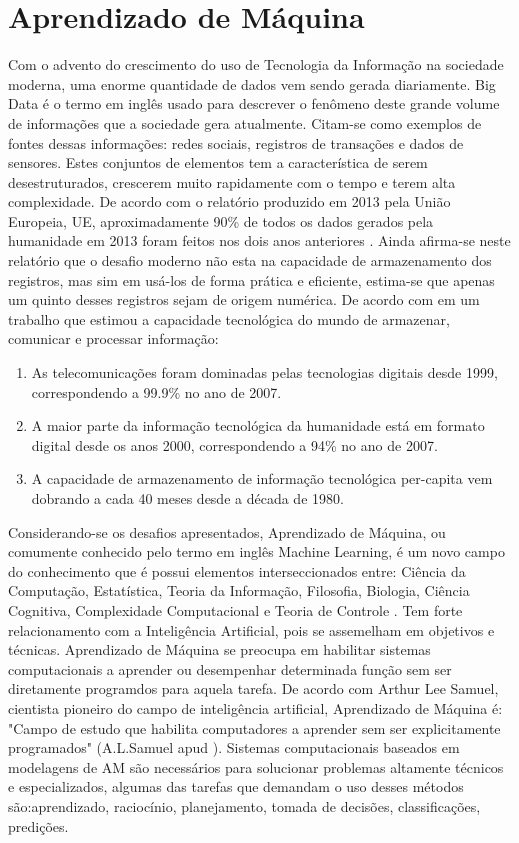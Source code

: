 \chapter{Aprendizado de Máquina}

Com o advento do crescimento do uso de Tecnologia da Informação na sociedade moderna, uma enorme quantidade de dados vem sendo gerada diariamente. Big Data é o termo em inglês usado para descrever o fenômeno deste grande volume de informações que a sociedade gera atualmente. Citam-se como exemplos de fontes dessas informações: redes sociais, registros de transações e dados de sensores. Estes conjuntos de elementos tem a característica de serem desestruturados, crescerem muito rapidamente com o tempo e terem alta complexidade. De acordo com o relatório produzido em 2013 pela União Europeia, UE, aproximadamente 90\% de todos os dados gerados pela humanidade em 2013 foram feitos nos dois anos anteriores \cite{eu2013}. Ainda afirma-se neste relatório que o desafio moderno não esta na capacidade de armazenamento dos registros, mas sim em usá-los de forma prática e eficiente, estima-se que apenas um quinto desses registros sejam de origem numérica. De acordo com \cite{lopez2011} em um trabalho que estimou a capacidade tecnológica do mundo de armazenar, comunicar e processar informação: 
\begin{enumerate}
\item As telecomunicações foram dominadas pelas tecnologias digitais desde 1999, correspondendo a 99.9\% no ano de 2007. 
\item A maior parte da informação tecnológica da humanidade está em formato digital desde os anos 2000, correspondendo a 94\% no ano de 2007.
\item A capacidade de armazenamento de informação tecnológica per-capita vem dobrando a cada 40 meses desde a década de 1980.
\end{enumerate}
   

Considerando-se os desafios apresentados, Aprendizado de Máquina, ou comumente conhecido pelo termo em inglês Machine Learning, é um novo campo do conhecimento que é possui elementos  interseccionados entre: Ciência da Computação, Estatística, Teoria da Informação, Filosofia, Biologia, Ciência Cognitiva, Complexidade Computacional e Teoria de Controle \cite{mitch1997}. Tem forte relacionamento  com a Inteligência Artificial, pois se assemelham em objetivos e técnicas. Aprendizado de Máquina se preocupa em habilitar sistemas computacionais a aprender ou desempenhar determinada função sem ser diretamente programdos para aquela tarefa. De acordo com Arthur Lee Samuel, cientista pioneiro do campo de inteligência artificial, Aprendizado de Máquina é: "Campo de estudo que habilita computadores a aprender sem ser explicitamente programados" (A.L.Samuel apud ). Sistemas computacionais baseados em modelagens de AM são necessários para solucionar problemas altamente técnicos e especializados, algumas das tarefas que demandam o uso desses métodos são:aprendizado, raciocínio, planejamento, tomada de decisões, classificações, predições. 

